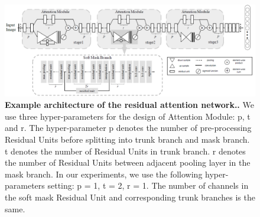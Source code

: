 \documentclass{article}
\newcommand{\mycaption}[2]{\caption[#1]{\textbf{#1.} #2}}
\begin{document}
\begin{figure}[!htb]  
\centering  
\includegraphics[width=6in]{imgs/attention_module_stage2.png}  
\mycaption{Example architecture of the residual attention network.}{We use three hyper-parameters for the design of Attention Module: p, t and r. The hyper-parameter p denotes the number of pre-processing Residual Units before splitting into trunk branch and mask branch. t denotes the number of Residual Units in trunk branch. r denotes the number of Residual Units between adjacent pooling layer in the mask branch. In our experiments, we use the following hyper-parameters setting: {p = 1, t = 2, r = 1}. The number of channels in the soft mask Residual Unit and corresponding trunk branches is the same.}  
\label{fig:attention_module_stage2}
\end{figure}
\end{document}
